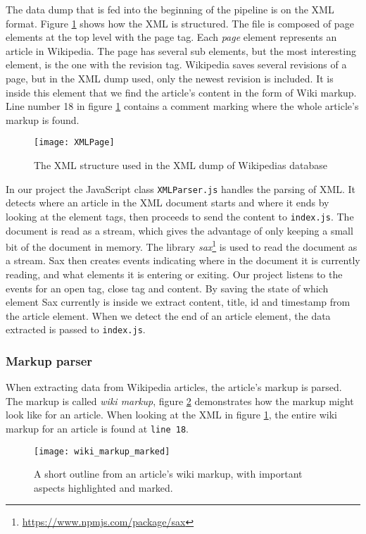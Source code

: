 The data dump that is fed into the beginning of the pipeline is on the XML format. Figure \ref{fig:xml} shows how the XML is structured. The file is composed of page elements at the top level with the page tag. Each \textit{page} element represents an article in Wikipedia. The page has several sub elements, but the most interesting element, is the one with the revision tag. Wikipedia saves several revisions of a page, but in the XML dump used, only the newest revision is included. It is inside this element that we find the article's content in the form of Wiki markup. Line number 18 in figure \ref{fig:xml} contains a comment marking where the whole article's markup is found.

\begin{figure}[h]
\caption{The XML structure used in the XML dump of Wikipedias database}
\texttt{[image: XMLPage]}
\label{fig:xml}
\end{figure}

In our project the JavaScript class \texttt{XMLParser.js} handles the parsing of XML. It detects where an article in the XML document starts and where it ends by looking at the element tags, then proceeds to send the content to \texttt{index.js}. The document is read as a stream, which gives the advantage of only keeping a small bit of the document in memory. The library \textit{sax}\footnote{\url{https://www.npmjs.com/package/sax}} is used to read the document as a stream. Sax then creates events indicating where in the document it is currently reading, and what elements it is entering or exiting. Our project listens to the events for an open tag, close tag and content. By saving the state of which element Sax currently is inside we extract content, title, id and timestamp from the article element. When we detect the end of an article element, the data extracted is passed to \texttt{index.js}.

\subsubsection{Markup parser}



When extracting data from Wikipedia articles, the article's markup is parsed. The markup is called \textit{wiki markup}, figure \ref{fig:wiki_markup} demonstrates how the markup might look like for an article. When looking at the XML in figure \ref{fig:xml}, the entire wiki markup for an article is found at \texttt{line 18}.

\begin{figure}[h]
\caption{A short outline from an article's wiki markup, with important aspects highlighted and marked. }
\texttt{[image: wiki\_markup\_marked]}
\label{fig:wiki_markup}
\end{figure}

